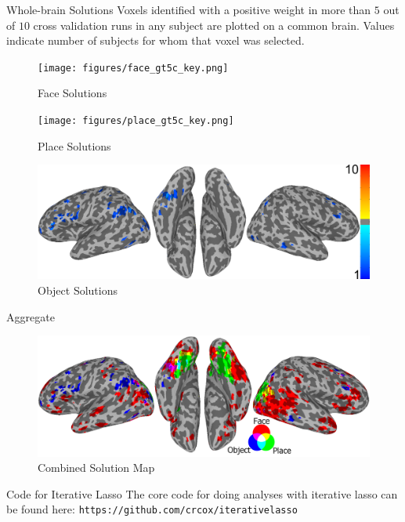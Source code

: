\documentclass[final]{beamer}
\newlength{\introcolwid}
\begin{document}
\begin{frame}[t]
\begin{columns}[t]
\begin{column}{\introcolwid}
		\begin{block}{Whole-brain Solutions}
			Voxels identified with a positive weight in more than $5$ out of $10$ cross validation runs in any subject are plotted on a common brain. Values indicate number of subjects for whom that voxel was selected.
			\begin{figure}
				\texttt{[image: figures/face\_gt5c\_key.png]}
				\caption{Face Solutions}
			\end{figure}
			\begin{figure}
				\texttt{[image: figures/place\_gt5c\_key.png]}
				\caption{Place Solutions}
			\end{figure}
			\begin{figure}
				\includegraphics[width=\textwidth]{figures/object_gt5c_key.png}
				\caption{Object Solutions}
			\end{figure}
		\end{block}
		\begin{block}{Aggregate}
			\begin{figure}
				\includegraphics[width=\textwidth]{figures/FPO_gt5b2.png}
				\caption{Combined Solution Map}
			\end{figure}
		\end{block}
		\begin{alertblock}{Code for Iterative Lasso}
			The core code for doing analyses with iterative lasso can be found here:
			\texttt{https://github.com/crcox/iterativelasso}
			

\end{alertblock}
\end{column}
\end{columns}
\end{frame}
\end{document}
